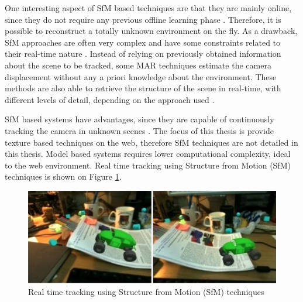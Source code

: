 One interesting aspect of SfM based techniques are that they are mainly online, since they do not require any previous offline learning phase \cite{Teichrieb2007}. Therefore, it is possible to reconstruct a totally unknown environment on the fly. As a drawback, SfM approaches are often very complex and have some constraints related to their real-time nature \cite{Teichrieb2007}.
Instead of relying on previously obtained information about the scene to be tracked, some MAR techniques estimate the camera displacement without any a priori knowledge about the environment. These methods are also able to retrieve the structure of the scene in real-time, with different levels of detail, depending on the approach used \cite{Teichrieb2007}.

SfM based systems have advantages, since they are capable of continuously tracking the camera in unknown scenes \cite{Teichrieb2007}. The focus of this thesis is provide texture based techniques on the web, therefore SfM techniques are not detailed in this thesis. Model based systems requires lower computational complexity, ideal to the web environment. Real time tracking using Structure from Motion (SfM) techniques \cite{Teichrieb2007} is shown on Figure \ref{figure:sfm}.

\begin{figure}[!htb]
  \centering
  \includegraphics[width=380pt]{chapters/basic_concepts/sfm.png}
  \caption{Real time tracking using Structure from Motion (SfM) techniques}
  \label{figure:sfm}
\end{figure}



